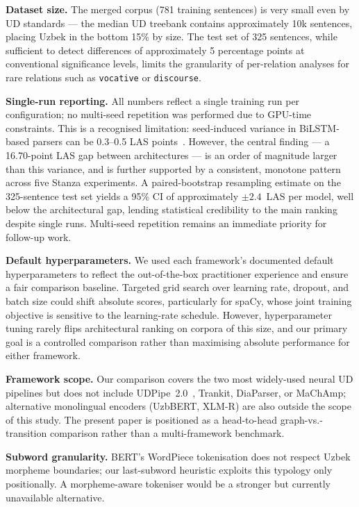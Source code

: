 \documentclass[10pt,conference,a4paper]{IEEEtran_EDM}
\begin{document}
\textbf{Dataset size.} The merged corpus (781 training sentences) is very small even by UD standards --- the median UD treebank contains approximately 10k sentences, placing Uzbek in the bottom 15\% by size. The test set of 325 sentences, while sufficient to detect differences of approximately 5 percentage points at conventional significance levels, limits the granularity of per-relation analyses for rare relations such as \texttt{vocative} or \texttt{discourse}.

\textbf{Single-run reporting.} All numbers reflect a single training run per configuration; no multi-seed repetition was performed due to GPU-time constraints. This is a recognised limitation: seed-induced variance in BiLSTM-based parsers can be 0.3--0.5 LAS points~\cite{kondratyuk2019cross}. However, the central finding --- a 16.70-point LAS gap between architectures --- is an order of magnitude larger than this variance, and is further supported by a consistent, monotone pattern across five Stanza experiments. A paired-bootstrap resampling estimate on the 325-sentence test set yields a 95\% CI of approximately $\pm 2.4$~LAS per model, well below the architectural gap, lending statistical credibility to the main ranking despite single runs. Multi-seed repetition remains an immediate priority for follow-up work.

\textbf{Default hyperparameters.} We used each framework's documented default hyperparameters to reflect the out-of-the-box practitioner experience and ensure a fair comparison baseline. Targeted grid search over learning rate, dropout, and batch size could shift absolute scores, particularly for spaCy, whose joint training objective is sensitive to the learning-rate schedule. However, hyperparameter tuning rarely flips architectural ranking on corpora of this size, and our primary goal is a controlled comparison rather than maximising absolute performance for either framework.

\textbf{Framework scope.} Our comparison covers the two most widely-used neural UD pipelines but does not include UDPipe~2.0~\cite{straka2018udpipe}, Trankit, DiaParser, or MaChAmp; alternative monolingual encoders (UzbBERT, XLM-R) are also outside the scope of this study. The present paper is positioned as a head-to-head graph-vs.-transition comparison rather than a multi-framework benchmark.

\textbf{Subword granularity.} BERT's WordPiece tokenisation does not respect Uzbek morpheme boundaries; our last-subword heuristic exploits this typology only positionally. A morpheme-aware tokeniser would be a stronger but currently unavailable alternative.
\end{document}
